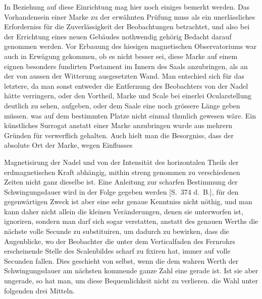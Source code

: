 \expandafter\def\csname HistoricalNoteText559\endcsname{In Beziehung auf diese Einrichtung mag hier noch einiges bemerkt werden. Das Vorhandensein einer Marke zu der erwähnten Prüfung muss als ein unerlässliches Erforderniss für die Zuverlässigkeit der Beobachtungen betrachtet, und also bei der Errichtung eines neuen Gebäudes nothwendig gehörig Bedacht darauf genommen werden. Vor Erbauung des hiesigen magnetischen Observatoriums war auch in Erwägung gekommen, ob es nicht besser sei, diese Marke auf einem eignen besonders fundirten Postament im Innern des Saals anzubringen, als an der von aussen der Witterung ausgesetzten Wand. Man entschied sich für das letztere, da man sonst entweder die Entfernung des Beobachters von der Nadel hätte verringern, oder den Vortheil, Marke und Scale bei einerlei Ocularstellung deutlich zu sehen, aufgeben, oder dem Saale eine noch grössere Länge geben müssen. was auf dem bestimmten Platze nicht einmal thunlich gewesen wäre. Ein künstliches Surrogat anstatt einer Marke anzubringen wurde aus mehrern Gründen für verwerflich gehalten. Auch hielt man die Besorgniss, dass der absolute Ort der Marke, wegen Einflusses}
\par\clearpage
{}
\noindent Magnetisirung der Nadel und von der Intensität des horizontalen Theils der erdmagnetischen Kraft abhängig, mithin streng genommen zu verschiedenen Zeiten nicht ganz dieselbe ist. Eine Anleitung zur scharfen Bestimmung der Schwingungsdauer wird in der Folge gegeben werden [S.\ 374 d.\ B.], für den gegenwärtigen Zweck ist aber eine sehr genaue Kenntniss nicht nöthig, und man kann daher nicht allein die kleinen Veränderungen, denen sie unterworfen ist, ignoriren, sondern man darf sich sogar verstatten, anstatt des genauen Werths die nächste volle Secunde zu substituiren, um dadurch zu bewirken, dass die Augenblicke, wo der Beobachter die unter dem Verticalfaden des Fernrohrs erscheinende Stelle des Scalenbildes scharf zu fixiren hat, immer auf volle Secunden fallen. Dies geschieht von selbst, wenn die dem wahren Werth der Schwingungsdauer am nächsten kommende ganze Zahl eine gerade ist. Ist sie aber ungerade, so hat man, um diese Bequemlichkeit nicht zu verlieren. die Wahl unter folgenden drei Mitteln.

